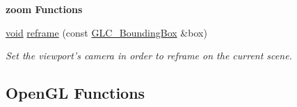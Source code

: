 \begin{Indent}{\bf zoom Functions}\par
\begin{DoxyCompactItemize}
\item 
\hyperlink{group___u_a_v_objects_plugin_ga444cf2ff3f0ecbe028adce838d373f5c}{void} \hyperlink{class_g_l_c___viewport_ad224244b26e75d56ff021e30cdb7f267}{reframe} (const \hyperlink{class_g_l_c___bounding_box}{G\-L\-C\-\_\-\-Bounding\-Box} \&box)
\begin{DoxyCompactList}\small\item\em Set the viewport's camera in order to reframe on the current scene. \end{DoxyCompactList}\end{DoxyCompactItemize}
\end{Indent}
\subsection*{Open\-G\-L Functions}
